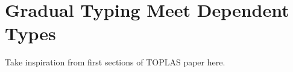 \chapter{Gradual Typing Meet Dependent Types}
\label{chap:gradual-dependent}

Take inspiration from first sections of TOPLAS paper here.